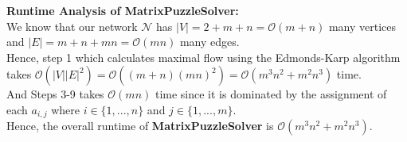 \documentclass[12pt]{article}
\begin{document}
\textbf{Runtime Analysis of MatrixPuzzleSolver:} \\

We know that our network $\mathcal{N}$ has $|V| = 2 + m + n = \mathcal{O}(m + n)$ many vertices and $|E| = m + n + mn = \mathcal{O}(mn)$ many edges. \\

Hence, step 1 which calculates maximal flow using the Edmonds-Karp algorithm takes $\mathcal{O}(|V||E|^2) = \mathcal{O}((m+n)(mn)^2) = \mathcal{O}(m^3n^2 + m^2n^3)$ time. \\

And Steps 3-9 takes $\mathcal{O}(mn)$ time since it is dominated by the assignment of each $a_{i,j}$ where $i \in \{1,...,n\}$ and $j \in \{1,...,m\}$. \\

Hence, the overall runtime of \textbf{MatrixPuzzleSolver} is $\mathcal{O}(m^3n^2 + m^2n^3)$. 
\end{document}
